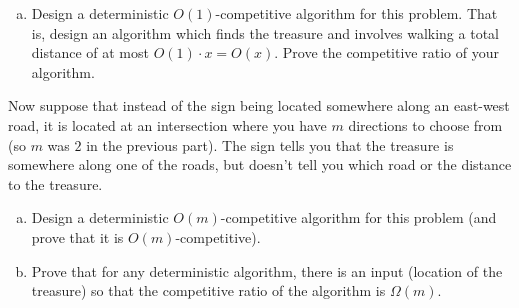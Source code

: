 \documentclass{article}
\begin{document}
\begin{enumerate}[(a)]
	\item Design a deterministic $O(1)$-competitive algorithm for this problem.  That is, design an algorithm which finds the treasure and involves walking a total distance of at most $O(1) \cdot x = O(x)$.  Prove the competitive ratio of your algorithm.

\end{enumerate}

Now suppose that instead of the sign being located somewhere along an east-west road, it is located at an intersection where you have $m$ directions to choose from (so $m$ was $2$ in the previous part).  The sign tells you that the treasure is somewhere along one of the roads, but doesn't tell you which road or the distance to the treasure.  

\begin{enumerate}[(a), resume]
	\item Design a deterministic $O(m)$-competitive algorithm for this problem (and prove that it is $O(m)$-competitive).

	\item Prove that for any deterministic algorithm, there is an input (location of the treasure) so that the competitive ratio of the algorithm is $\Omega(m)$.  

\end{enumerate}
\end{document}
